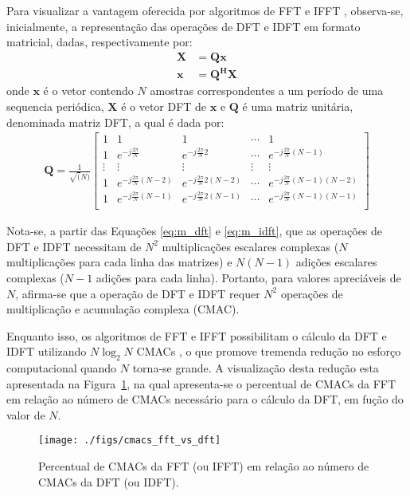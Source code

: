 Para visualizar a vantagem oferecida por algoritmos de FFT e IFFT \cite{dspambardar}, observa-se, inicialmente, a representação das operações de DFT e IDFT em formato matricial, dadas, respectivamente por:
\begin{align}
\mathbf{X} &= \mathbf{Q} \mathbf{x} \label{eq:m_dft}\\
\mathbf{x} &= \mathbf{Q^H} \mathbf{X} \label{eq:m_idft}
\end{align}
onde $\mathbf{x}$ é o vetor contendo $N$ amostras correspondentes a um período de uma sequencia periódica, $\mathbf{X}$ é o vetor DFT de $\mathbf{x}$ e $\mathbf{Q}$ é uma matriz unitária, denominada matriz DFT, a qual é dada por:
\begin{align}
\mathbf{Q} =\frac{1}{\sqrt(N)}\left[ \begin{array}{ccccc}
1 & 1 & 1 & \cdots & 1\\
1 & e^{-j\frac{2\pi}{N}} & e^{-j\frac{2\pi}{N}2} & \cdots & e^{-j\frac{2\pi}{N}(N-1)}\\
\vdots & \vdots & \vdots & \vdots & \vdots\\
1 & e^{-j\frac{2\pi}{N}(N-2)} & e^{-j\frac{2\pi}{N}2(N-2)} & \cdots & e^{-j\frac{2\pi}{N}(N-1)(N-2)}\\
1 & e^{-j\frac{2\pi}{N}(N-1)} & e^{-j\frac{2\pi}{N}2(N-1)} & \cdots & e^{-j\frac{2\pi}{N}(N-1)(N-1)}\\
\end{array} \right]
\label{eq:q_matrix}
\end{align}

Nota-se, a partir das Equações \ref{eq:m_dft} e \ref{eq:m_idft}, que as operações de DFT e IDFT necessitam de $N^2$ multiplicações escalares complexas ($N$ multiplicações para cada linha das matrizes) e $N(N-1)$ adições escalares complexas ($N-1$ adições para cada linha). Portanto, para valores apreciáveis de $N$, afirma-se que a operação de DFT e IDFT requer $N^2$ operações de multiplicação e acumulação complexa (CMAC). 

Enquanto isso, os algoritmos de FFT e IFFT possibilitam o cálculo da DFT e IDFT utilizando $N\log_2{N}$ CMACs \cite{ee379c}, o que promove tremenda redução no esforço computacional quando $N$ torna-se grande. A visualização desta redução esta apresentada na Figura~\ref{fig:cmacs_fft}, na qual apresenta-se o percentual de CMACs da FFT em relação ao número de CMACs necessário para o cálculo da DFT, em fução do valor de $N$.

\begin{figure}[htbp]
\centering
\texttt{[image: ./figs/cmacs\_fft\_vs\_dft]}
\caption{Percentual de CMACs da FFT (ou IFFT) em relação ao número de CMACs da DFT (ou IDFT).
\label{fig:cmacs_fft}}
\end{figure} 


